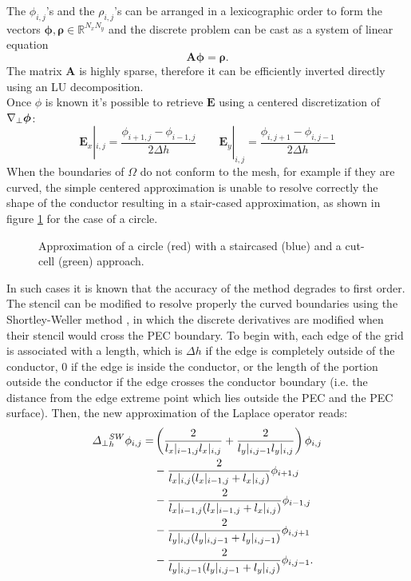 The $\phi_{i, j}$'s and the $\rho_{i,j}$'s can be arranged in a lexicographic order to form the vectors $\boldsymbol{\phi}, \boldsymbol{\rho} \in \mathbb{R}^{N_xN_y}$ and the discrete problem can be cast as a system of linear equation $$\mathbf{A}\boldsymbol{\phi} = \boldsymbol{\rho}.$$
The matrix $\mathbf{A}$ is highly sparse, therefore it can be efficiently inverted directly using an LU decomposition.\\
Once $\phi$ is known it's possible to retrieve $\mathbf{E}$ using a centered discretization of $\nabla_{\perp}\boldsymbol{\phi}$:
\begin{equation*}
    \mathbf{E}_x|_{i,j} = \frac{\phi_{i+1,j} - \phi_{i-1,j}}{2\Delta h} \qquad 
    \mathbf{E}_y|_{i,j} = \frac{\phi_{i,j+1} - \phi_{i,j-1}}{2\Delta h}
\end{equation*}
When the boundaries of $\Omega$ do not conform to the mesh, for example if they are curved, the simple centered approximation is unable to resolve correctly the shape of the conductor resulting in a stair-cased approximation, as shown in figure \ref{fig:SCvsCutCell} for the case of a circle.
\begin{figure}
        \centering
        
        \caption{Approximation of a circle (red) with a staircased (blue) and a cut-cell (green) approach.}
        \label{fig:SCvsCutCell}
\end{figure}
In such cases it is known that the accuracy of the method degrades to first order. The stencil can be modified to resolve properly the curved boundaries using the Shortley-Weller method \cite{ShortleyWeller}, in which the discrete derivatives are modified when their stencil would cross the PEC boundary. To begin with, each edge of the grid is associated with a length, which is $\Delta h$ if the edge is completely outside of the conductor, 0 if the edge is inside the conductor, or the length of the portion outside the conductor if the edge crosses the conductor boundary (i.e. the distance from the edge extreme point which lies outside the PEC and the PEC surface). Then, the new approximation of the Laplace operator reads:
\begin{align*}
    {\Delta_{\perp}}_h^{SW} \phi_{i,j} = & \left(\frac{2}{l_x|_{i-1,j} l_x|_{i,j}} + \frac{2}{l_y|_{i,j-1} l_y|_{i,j}}\right)\phi_{i,j}\\
    &- \frac{2}{l_x|_{i, j}(l_x|_{i-1, j} + l_x|_{i, j})}\phi_{i+1,j}\\
    &- \frac{2}{l_x|_{i-1, j}(l_x|_{i-1, j} + l_x|_{i, j})}\phi_{i - 1,j}\\
    &- \frac{2}{l_y|_{i, j}(l_y|_{i, j-1} + l_y|_{i, j-1})}\phi_{i,j+1}\\
    &- \frac{2}{l_y|_{i, j-1}(l_y|_{i, j-1} + l_y|_{i, j})}\phi_{i,j-1}.
\end{align*}
